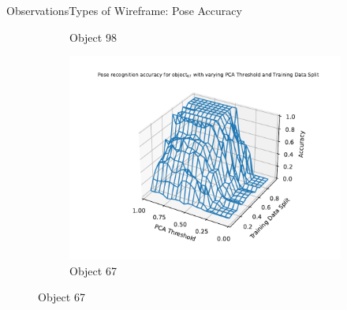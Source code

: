 \documentclass[aspectratio=169, handout, 10pt, hyperref=colorlinks]{beamer}
\begin{document}
\begin{frame}{Observations}{Types of Wireframe: Pose Accuracy}
\begin{figure}
\begin{subfigure}{0.32\linewidth}
            \caption{Object 98}
        \end{subfigure}
        \begin{subfigure}{0.32\linewidth}
            \centering
            \includegraphics[width=1.2\linewidth]{wireframe/pose/67.pdf}
            \caption{Object 67}
        \end{subfigure}
    \end{figure}
\end{frame}
\end{document}
